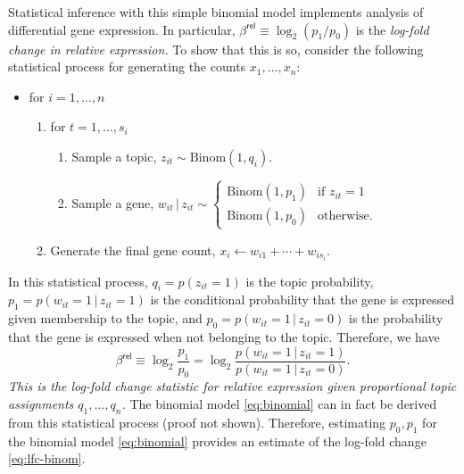 \documentclass[final]{siamart171218}
\begin{document}
Statistical inference with this simple binomial model implements
analysis of differential gene expression. In particular,
$\beta^{\mathsf{rel}} \equiv \log_2(p_1/p_0)$ is the {\em log-fold
  change in relative expression.} To show that this is so, consider
the following statistical process for generating the counts $x_1,
\ldots, x_n$:
\vspace{1em}
\begin{itemize}

\item for $i = 1, \ldots, n$
\begin{enumerate}

  \item for $t = 1, \ldots, s_i$
  \begin{enumerate}

  \item Sample a topic, $z_{it} \sim \mathrm{Binom}(1,q_i)$.

  \item Sample a gene, $w_{it} \,|\, z_{it} \sim \left\{\begin{array}{ll}
  \mathrm{Binom}(1,p_1) & \mbox{if $z_{it} = 1$} \\
  \mathrm{Binom}(1,p_0) & \mbox{otherwise.}
  \end{array}\right.$

  \end{enumerate}

  \item Generate the final gene count, 
  $x_i \leftarrow w_{i1} + \cdots + w_{is_i}$.

\end{enumerate}
\end{itemize}
\vspace{1em} In this statistical process, $q_i = p(z_{it} = 1)$ is the
topic probability, $p_1 = p(w_{it} = 1 \,|\, z_{it} = 1)$ is the
conditional probability that the gene is expressed given membership to
the topic, and $p_0 = p(w_{it} = 1 \,|\, z_{it} = 0)$ is the
probability that the gene is expressed when not belonging to the
topic. Therefore, we have
\begin{equation}
\beta^{\mathsf{rel}} \equiv \log_2 \frac{p_1}{p_0}  
= \log_2 \frac{p(w_{it} = 1 \,|\, z_{it} = 1)}
            {p(w_{it} = 1 \,|\, z_{it} = 0)}.
\label{eq:lfc-binom}
\end{equation}
{\em This is the log-fold change statistic for relative expression
  given proportional topic assignments $q_1, \ldots, q_n$.} The
binomial model \eqref{eq:binomial} can in fact be derived from this
statistical process (proof not shown). Therefore, estimating $p_0,
p_1$ for the binomial model \eqref{eq:binomial} provides an estimate
of the log-fold change \eqref{eq:lfc-binom}.
\end{document}
